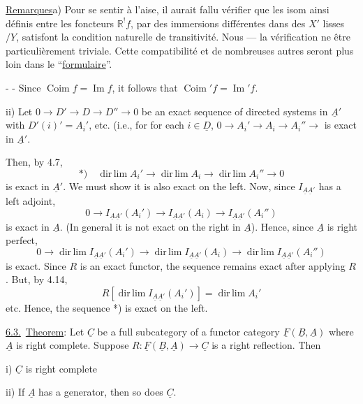 \uline{Remarques}\quad a) Pour se sentir à l'aise, il aurait fallu vérifier que les isom ainsi définis entre les foncteurs $\mathbb{R}^!f$, par des immersions différentes dans des $X'$ lisses $/Y$, satisfont la condition naturelle de transitivité.
Nous  --- la vérification ne  être particulièrement triviale. Cette compatibilité et de nombreuses autres seront  plus loin dans le ``\uline{formulaire}''.

-  -
Since $\operatorname{Coim}f=\operatorname{Im}f$, it follows that $\operatorname{Coim}'f=\operatorname{Im}'f$.

ii) Let $0\longrightarrow D'\longrightarrow D\longrightarrow D''\longrightarrow0$ be an exact sequence of directed systems in $\underline A'$ with $D'(i)'=A_i'$, etc.
(i.e., for for each $i\in\underline D$, $0\longrightarrow A_i'\longrightarrow A_i\longrightarrow A_i''\longrightarrow$ is exact in $\underline A'$.

Then, by 4.7,
\[
*)\quad\operatorname{dir\,lim}A_i'\longrightarrow\operatorname{dir\,lim}A_i
\longrightarrow\operatorname{dir\,lim}A_i''\longrightarrow0
\]
is exact in $\underline A'$. We must show it is also exact on the left. Now, since $I_{\underline A\underline A'}$ has a left adjoint,
\[
0\longrightarrow I_{\underline A\underline A'}(A_i')
\longrightarrow I_{\underline A\underline A'}(A_i)
\longrightarrow I_{\underline A\underline A'}(A_i'')
\]
is exact in $\underline A$. (In general it is not exact on the right in $\underline A$).
Hence, since $\underline A$ is right perfect,
\[
0\longrightarrow\operatorname{dir\,lim}I_{\underline A\underline A'}(A_i')
\longrightarrow\operatorname{dir\,lim}I_{\underline A\underline A'}(A_i)
\longrightarrow\operatorname{dir\,lim}I_{\underline A\underline A'}(A_i'')
\]
is exact. Since $R$ is an exact functor, the sequence remains exact after applying $R$. But, by 4.14,
\[
R[\operatorname{dir\,lim}I_{\underline A\underline A'}(A_i')]
=\operatorname{dir\,lim}A_i'
\]
etc. Hence, the sequence *) is exact on the left.

\uline{6.3.}\ \uline{Theorem}: Let $\underline C$ be a full subcategory of a functor category $\underline F(\underline B,\underline A)$ where $\underline A$ is right complete. Suppose $R:\underline F(\underline B,\underline A)\longrightarrow\underline C$ is a right reflection. Then

i) $\underline C$ is right complete

ii) If $\underline A$ has a generator, then so does $\underline C$.

